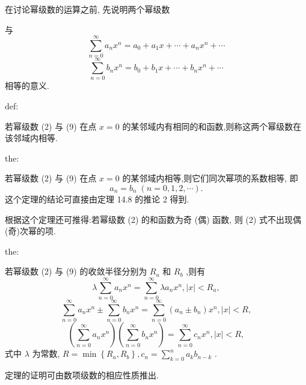 在讨论幂级数的运算之前, 先说明两个幂级数

与
\[
\mathop{\sum }\limits_{{n = 0}}^{\infty }{a}_{n}{x}^{n} = {a}_{0} + {a}_{1}x + \cdots  + {a}_{n}{x}^{n} + \cdots  \tag{2}
\]
\[
\mathop{\sum }\limits_{{n = 0}}^{\infty }{b}_{n}{x}^{n} = {b}_{0} + {b}_{1}x + \cdots  + {b}_{n}{x}^{n} + \cdots  \tag{9}
\]
相等的意义.

\begin{definition}{}{def:}

\end{definition}
若幂级数 (2) 与 (9) 在点 \(x = 0\) 的某邻域内有相同的和函数,则称这两个幂级数在该邻域内相等.

\begin{theorem}{}{the:}

\end{theorem}
 若幂级数 (2) 与 (9) 在点 \(x = 0\) 的某邻域内相等,则它们同次幂项的系数相等, 即
\[
{a}_{n} = {b}_{n}\;\left( {n = 0,1,2,\cdots }\right) .
\]
这个定理的结论可直接由定理 14.8 的推论 2 得到.

根据这个定理还可推得:若幂级数 (2) 的和函数为奇 (偶) 函数, 则 (2) 式不出现偶 (奇)次幂的项.

\begin{theorem}{}{the:}

\end{theorem}
 若幂级数 (2) 与 (9) 的收敛半径分别为 \({R}_{a}\) 和 \({R}_{b}\) ,则有
\[
\lambda \mathop{\sum }\limits_{{n = 0}}^{\infty }{a}_{n}{x}^{n} = \mathop{\sum }\limits_{{n = 0}}^{\infty }\lambda {a}_{n}{x}^{n},\left| x\right|  < {R}_{a},
\]
\[
\mathop{\sum }\limits_{{n = 0}}^{\infty }{a}_{n}{x}^{n} \pm  \mathop{\sum }\limits_{{n = 0}}^{\infty }{b}_{n}{x}^{n} = \mathop{\sum }\limits_{{n = 0}}^{\infty }\left( {{a}_{n} \pm  {b}_{n}}\right) {x}^{n},\left| x\right|  < R,
\]
\[
\left( {\mathop{\sum }\limits_{{n = 0}}^{\infty }{a}_{n}{x}^{n}}\right) \left( {\mathop{\sum }\limits_{{n = 0}}^{\infty }{b}_{n}{x}^{n}}\right)  = \mathop{\sum }\limits_{{n = 0}}^{\infty }{c}_{n}{x}^{n},\left| x\right|  < R,
\]
式中 \(\lambda\) 为常数, \(R = \min \left\{  {{R}_{a},{R}_{b}}\right\}  ,{c}_{n} = \mathop{\sum }\limits_{{k = 0}}^{n}{a}_{k}{b}_{n - k}\) .

定理的证明可由数项级数的相应性质推出.

